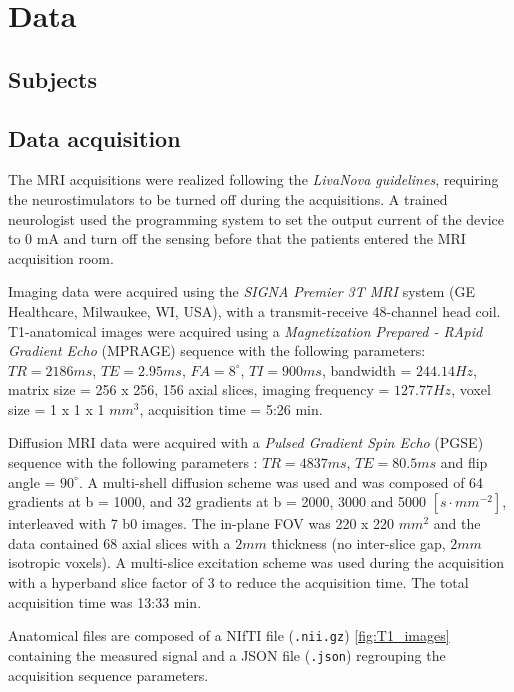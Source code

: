 \section{Data}
 \subsection{Subjects}



 \subsection{Data acquisition}
 The MRI acquisitions were realized following the \emph{LivaNova guidelines}, requiring the neurostimulators to be turned off during the acquisitions. A trained neurologist used the programming system to set the output current of the device to 0 mA and turn off the sensing before that the patients entered the MRI acquisition room. 

 Imaging data were acquired using the \emph{SIGNA\textsuperscript{\texttrademark} Premier 3T MRI} system (GE Healthcare, Milwaukee, WI, USA), with a transmit-receive 48-channel head coil. \\ T1-anatomical images were acquired using a \emph{Magnetization Prepared - RApid Gradient Echo} (MPRAGE) sequence with the following parameters: $TR = 2186 ms$, $TE = 2.95 ms$, $FA = 8^{\circ}$, $TI = 900 ms$, bandwidth = $244.14 Hz$, matrix size = 256 x 256, 156 axial slices, imaging frequency = $127.77 Hz$, voxel size = 1 x 1 x 1 $mm^3$, acquisition time = 5:26 min.

 Diffusion MRI data were acquired with a \emph{Pulsed Gradient Spin Echo} (PGSE) sequence with the following parameters : $TR = 4837 ms$, $TE = 80.5 ms$ and flip angle = $90^{\circ}$. A multi-shell diffusion scheme was used and was composed of 64 gradients at b = 1000, and 32 gradients at b = 2000, 3000 and 5000 $[s \cdot mm^{-2}]$, interleaved with 7 b0 images. The in-plane FOV was 220 x 220 $mm^{2}$ and the data contained 68 axial slices with a $2 mm$ thickness (no inter-slice gap, $2 mm$ isotropic voxels). A multi-slice excitation scheme was used during the acquisition with a hyperband slice factor of 3 to reduce the acquisition time. The total acquisition time was 13:33 min.

 Anatomical files are composed of a NIfTI file (\texttt{.nii.gz}) \ref{fig:T1_images} containing the measured signal and a JSON file (\texttt{.json}) regrouping the acquisition sequence parameters.

